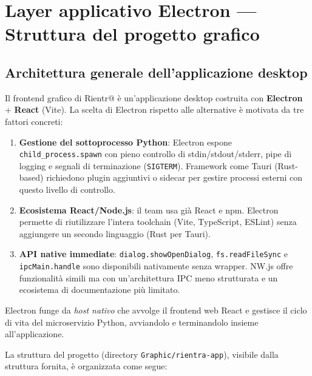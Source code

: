 \documentclass[a4paper,12pt]{article}
\begin{document}
\section{Layer applicativo Electron --- Struttura del progetto grafico}

\subsection{Architettura generale dell'applicazione desktop}

Il frontend grafico di Rientr@ \`{e} un'applicazione desktop costruita
con \textbf{Electron} + \textbf{React} (Vite). La scelta di Electron
rispetto alle alternative \`{e} motivata da tre fattori concreti:
\begin{enumerate}
  \item \textbf{Gestione del sottoprocesso Python}: Electron espone
        \texttt{child\_process.spawn} con pieno controllo di stdin/stdout/stderr,
        pipe di logging e segnali di terminazione (\texttt{SIGTERM}).
        Framework come Tauri (Rust-based) richiedono plugin aggiuntivi
        o sidecar per gestire processi esterni con questo livello di controllo.
  \item \textbf{Ecosistema React/Node.js}: il team usa gi\`{a} React e npm.
        Electron permette di riutilizzare l'intera toolchain (Vite, TypeScript,
        ESLint) senza aggiungere un secondo linguaggio (Rust per Tauri).
  \item \textbf{API native immediate}: \texttt{dialog.showOpenDialog},
        \texttt{fs.readFileSync} e \texttt{ipcMain.handle} sono disponibili
        nativamente senza wrapper. NW.js offre funzionalit\`{a} simili ma
        con un'architettura IPC meno strutturata e un ecosistema di
        documentazione pi\`{u} limitato.
\end{enumerate}
Electron funge da \textit{host nativo} che avvolge il frontend web React
e gestisce il ciclo di vita del microservizio Python, avviandolo e terminandolo
insieme all'applicazione.

La struttura del progetto (directory \texttt{Graphic/rientra-app}),
visibile dalla struttura fornita, \`{e} organizzata come segue:
\end{document}
